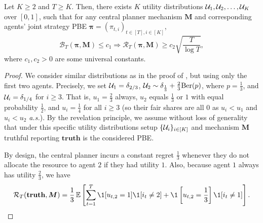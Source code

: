 \begin{theorem}\label{thm:lower_bound_nb_checks}
Let $K\geq 2$ and $T\geq K$. Then, there exists $K$ utility distributions $\mathcal{U}_1,\mathcal{U}_2,\ldots,\mathcal{U}_K$ over $[0,1]$, such that for any central planner mechanism $\bm M$ and corresponding agents' joint strategy PBE $\bm \pi=(\pi_{t,i})_{t\in [T],i\in[K]}$,
\begin{equation*}
    \mathcal B_T(\bm \pi,\bm M)\leq c_1\Longrightarrow \mathcal R_T(\bm \pi,\bm M)\ge c_2\sqrt {\frac{T}{\log T}},
\end{equation*}
where $c_1,c_2>0$ are some universal constants.
\end{theorem}
\begin{proof}
    We consider similar distributions as in the proof of , but using only the first two agents. Precisely, we set $\mathcal{U}_1=\delta_{2/3}$,  $\mathcal{U}_2\sim\delta_{\frac{1}{3}} + \frac{2}{3}\text{Ber}(p)$, where $p=\frac{1}{3}$, and $\mathcal{U}_i=\delta_{1/4}$ for $i\geq 3$. That is, $u_1=\frac{2}{3}$ always, $u_2$ equals $\frac{1}{3}$ or $1$ with equal probability $\frac{1}{2}$, and $u_i=\frac{1}{4}$ for all $i\geq 3$ (so their fair shares are all 0 as $u_i<u_1$ and $u_i<u_2$ \textit{a.s.}). By the revelation principle, we assume without loss of generality that under this specific utility distributions setup $\{\mathcal{U}_i\}_{i\in [K]}$ and mechanism $\bm M$ truthful reporting $\textbf{truth}$ is the considered PBE. 

    By design, the central planner incurs a constant regret $\frac 13$ whenever they do not allocate the resource to agent $2$ if they had utility $1$. Also, because agent $1$ always has utility $\frac 23$, we have
    \begin{equation}\label{eq:lower_bound_regret}
        \mathcal R_T(\textbf{truth},\bm M) = \frac{1}{3}\E\sqb{\sum_{t=1}^T \1[u_{t,2}=1]\1[i_t\neq 2] + \1\sqb{u_{t,2}=\frac{1}{3} }\1[i_t\neq 1]}.
    \end{equation}


\end{proof}
